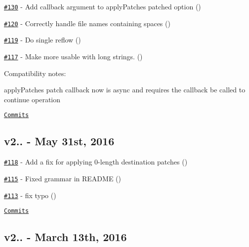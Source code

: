 \begin{DoxyItemize}
\item \href{https://github.com/kpdecker/jsdiff/pull/130}{\tt \#130} -\/ Add callback argument to apply\+Patches {\ttfamily patched} option (\href{https://api.github.com/users/piranna}{\tt })
\item \href{https://github.com/kpdecker/jsdiff/pull/120}{\tt \#120} -\/ Correctly handle file names containing spaces (\href{https://api.github.com/users/adius}{\tt })
\item \href{https://github.com/kpdecker/jsdiff/pull/119}{\tt \#119} -\/ Do single reflow (\href{https://api.github.com/users/wifiextender}{\tt })
\item \href{https://github.com/kpdecker/jsdiff/pull/117}{\tt \#117} -\/ Make more usable with long strings. (\href{https://api.github.com/users/abnbgist}{\tt })
\end{DoxyItemize}

Compatibility notes\+:
\begin{DoxyItemize}
\item apply\+Patches patch callback now is async and requires the callback be called to continue operation
\end{DoxyItemize}

\href{https://github.com/kpdecker/jsdiff/compare/v2.2.3...v3.0.0}{\tt Commits}

\subsection*{v2.. -\/ May 31st, 2016}


\begin{DoxyItemize}
\item \href{https://github.com/kpdecker/jsdiff/pull/118}{\tt \#118} -\/ Add a fix for applying 0-\/length destination patches (\href{https://api.github.com/users/chaaz}{\tt })
\item \href{https://github.com/kpdecker/jsdiff/pull/115}{\tt \#115} -\/ Fixed grammar in R\+E\+A\+D\+ME (\href{https://api.github.com/users/krizalys}{\tt })
\item \href{https://github.com/kpdecker/jsdiff/pull/113}{\tt \#113} -\/ fix typo (\href{https://api.github.com/users/vmazare}{\tt })
\end{DoxyItemize}

\href{https://github.com/kpdecker/jsdiff/compare/v2.2.2...v2.2.3}{\tt Commits}

\subsection*{v2.. -\/ March 13th, 2016}


